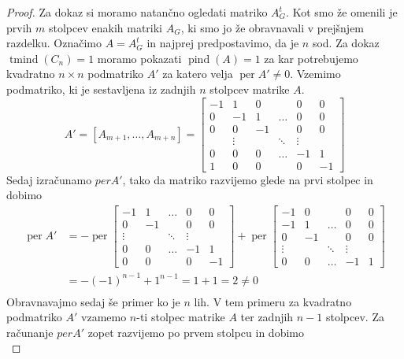 \documentclass[12pt,a4paper,twoside]{article}
\theoremstyle{definition} %
\theoremstyle{plain} %
\numberwithin{equation}{section}  %
\DeclareMathOperator{\per}{per}
\DeclareMathOperator{\tmind}{tmind}
\DeclareMathOperator{\pind}{pind}
\begin{document}
\begin{proof}
Za dokaz si moramo natančno ogledati matriko $A_G^t$. Kot smo že omenili je prvih $m$ stolpcev enakih matriki $A_G$, ki smo jo že obravnavali v prejšnjem razdelku. Označimo $A =  A_G^t$ in najprej predpostavimo, da je $n$ sod. Za dokaz $\tmind(C_n) = 1$ moramo pokazati $\pind(A) = 1$ za kar potrebujemo kvadratno $n \times n$ podmatriko $A'$ za katero velja $\per A' \neq 0$. Vzemimo podmatriko, ki je sestavljena iz zadnjih $n$ stolpcev matrike $A$.
$$ 
A' =[A_{m+1}, \ldots, A_{m+n}] = 
\left[
\begin{matrix} -1 & 1 & 0 &  & 0 & 0 \\ 0 & -1 & 1 & \ldots & 0 & 0 \\
0 & 0 & -1 &  & 0 & 0 \\ 
 & \vdots &  & \ddots & \vdots &  \\ 
0 & 0 & 0 & \ldots & -1 & 1 \\
 1 & 0 & 0 &  & 0 & -1 
\end{matrix} \right]
$$
Sedaj izračunamo $perA'$, tako da matriko razvijemo glede na prvi stolpec in dobimo
\begin{equation*}
\begin{split}
 \per A' &=-\per \left[ 
\begin{matrix} 
 -1 & 1 & \ldots & 0 & 0 \\ 
 0 & -1 &  & 0 & 0 \\ 
 \vdots &  & \ddots & \vdots &  \\ 
 0 & 0 & \ldots & -1 & 1 \\
 0 & 0 &  & 0 & -1 
\end{matrix} \right]
+\per\left[
\begin{matrix} 
- 1 & 0 &  & 0 & 0 \\
 -1 & 1 & \ldots & 0 & 0 \\  0 & -1 &  & 0 & 0 \\ 
  \vdots &  & \ddots & \vdots &  \\ 
 0 & 0 & \ldots & -1 & 1 
\end{matrix} \right] \\
&=-(-1)^{n-1} + 1^{n-1} =  1 + 1 = 2 \neq 0\\
\end{split}
\end{equation*}
Obravnavajmo sedaj še primer ko je $n$ lih. V tem primeru za kvadratno podmatriko $A'$ vzamemo $n$-ti stolpec matrike $A$ ter zadnjih $n-1$ stolpcev. Za računanje $perA'$ zopet razvijemo po prvem stolpcu in dobimo
\begin{equation*}

\end{equation*}
\end{proof}
\end{document}
